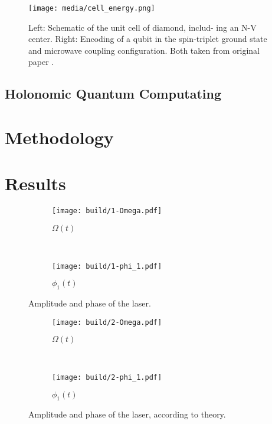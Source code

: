 \documentclass[%
reprint,
amsmath,amssymb,
aps,
]{revtex4-2}
\begin{document}
\begin{figure}
  \centering
  \texttt{[image: media/cell\_energy.png]}
  \caption{Left: Schematic of the unit cell of diamond, includ-
    ing an N-V center. Right: Encoding of a qubit in the spin-triplet
  ground state and microwave coupling conﬁguration. Both taken from original paper
\cite{PhysRevApplied.16.024060}.}
  \label{fig:NV-center}
\end{figure}

  \subsection{Holonomic Quantum Computating}
  \label{sec:HQC}

  \section{Methodology}
  \label{sec:Methodology}

  \section{Results}
  \label{sec:Results}

  \begin{figure}
    \centering
    \begin{subfigure}[b]{0.45\textwidth}
      \centering
      \texttt{[image: build/1-Omega.pdf]}
      \caption{$\Omega(t)$}
      \label{fig:1-Omega}
    \end{subfigure}
    \,
    \begin{subfigure}[b]{0.45\textwidth}
      \centering
      \texttt{[image: build/1-phi\_1.pdf]}
      \caption{$\phi_1(t)$}
      \label{fig:1-phi_1}
    \end{subfigure}
    \caption{Amplitude and phase of the laser.}
  \end{figure}



  \begin{figure}
    \centering
    \begin{subfigure}[b]{0.45\textwidth}
      \centering
      \texttt{[image: build/2-Omega.pdf]}
      \caption{$\Omega(t)$}
      \label{fig:1-Omega}
    \end{subfigure}
    \,
    \begin{subfigure}[b]{0.45\textwidth}
      \centering
      \texttt{[image: build/2-phi\_1.pdf]}
      \caption{$\phi_1(t)$}
      \label{fig:1-phi_1}
    \end{subfigure}
    \caption{Amplitude and phase of the laser, according to theory.}
  \end{figure}
\end{document}
